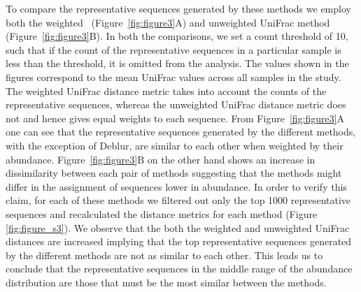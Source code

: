   To compare the representative sequences generated by these methods we employ both the weighted~\cite{Lozupone2007} (Figure~\ref{fig:figure3}A) and unweighted UniFrac method~\cite{Lozupone2005} (Figure~\ref{fig:figure3}B).
  In both the comparisons, we set a count threshold of 10, such that if the count of the representative sequences in a particular sample is less than the threshold, it is omitted from the analysis.
  The values shown in the figures correspond to the mean UniFrac values across all samples in the study.
  The weighted UniFrac distance metric takes into account the counts of the representative sequences, whereas the unweighted UniFrac distance metric does not and hence gives equal weights to each sequence.
  From Figure~\ref{fig:figure3}A one can see that the representative sequences generated by the different methods, with the exception of Deblur, are similar to each other when weighted by their abundance.
  Figure~\ref{fig:figure3}B on the other hand shows an increase in dissimilarity between each pair of methods suggesting that the methods might differ in the assignment of sequences lower in abundance.
  In order to verify this claim, for each of these methods we filtered out only the top 1000 representative sequences and recalculated the distance metrics for each method (Figure \ref{fig:figure_s3}).
  We observe that the both the weighted and unweighted UniFrac distances are increased implying that the top representative sequences generated by the different methods are not as similar to each other.
  This leads us to conclude that the representative sequences in the middle range of the abundance distribution are those that must be the most similar between the methods.

